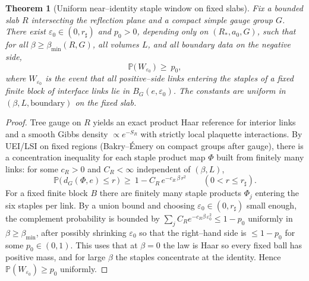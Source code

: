 \documentclass[11pt]{amsart}
\theoremstyle{plain}
\newtheorem{theorem}{Theorem}[section]
\theoremstyle{definition}
\theoremstyle{remark}
\begin{document}
\begin{theorem}[Uniform near--identity staple window on fixed slabs]\label{thm:staple-window}
Fix a bounded slab $R$ intersecting the reflection plane and a compact simple gauge group $G$. There exist $\varepsilon_0\in(0,r_\sharp)$ and $p_0>0$, depending only on $(R_*,a_0,G)$, such that for all $\beta\ge \beta_{\min}(R,G)$, all volumes $L$, and all boundary data on the negative side,
\[
  \mathbb P\big(\,W_{\varepsilon_0}\,\big)\ \ge\ p_0,
\]
where $W_{\varepsilon_0}$ is the event that all positive--side links entering the staples of a fixed finite block of interface links lie in $B_G(e,\varepsilon_0)$. The constants are uniform in $(\beta,L,\text{boundary})$ on the fixed slab.
\end{theorem}
\begin{proof}
Tree gauge on $R$ yields an exact product Haar reference for interior links and a smooth Gibbs density $\propto e^{-S_R}$ with strictly local plaquette interactions. By UEI/LSI on fixed regions (Bakry--\'Emery on compact groups after gauge), there is a concentration inequality for each staple product map $\Phi$ built from finitely many links: for some $c_R>0$ and $C_R<\infty$ independent of $(\beta,L)$,
\[
  \mathbb P\big(\,d_G(\Phi, e)\le r\,\big)\ \ge\ 1- C_R\, e^{-c_R\,\beta\, r^2}\qquad(0<r\le r_\sharp).
\]
For a fixed finite block $B$ there are finitely many staple products $\Phi_j$ entering the six staples per link. By a union bound and choosing $\varepsilon_0\in(0,r_\sharp)$ small enough, the complement probability is bounded by $\sum_j C_R e^{-c_R\beta\,\varepsilon_0^2}\le 1-p_0$ uniformly in $\beta\ge \beta_{\min}$, after possibly shrinking $\varepsilon_0$ so that the right--hand side is $\le 1-p_0$ for some $p_0\in(0,1)$. This uses that at $\beta=0$ the law is Haar so every fixed ball has positive mass, and for large $\beta$ the staples concentrate at the identity. Hence $\mathbb P(W_{\varepsilon_0})\ge p_0$ uniformly.
\end{proof}
\end{document}
